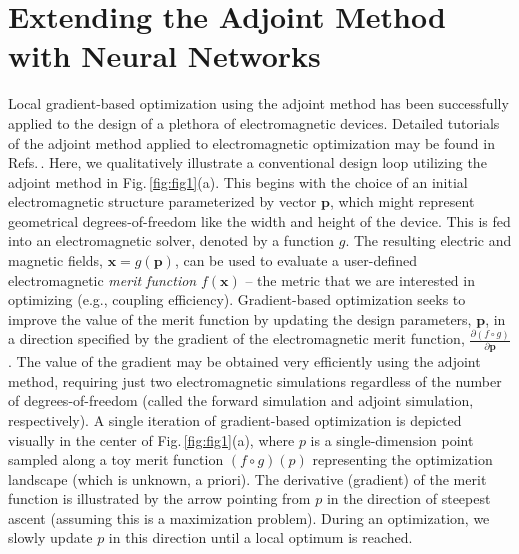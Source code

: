 \documentclass{article}
\begin{document}
\section{Extending the Adjoint Method with Neural Networks}
\label{sec:description}


Local gradient-based optimization using the adjoint method has been successfully applied to the design of a plethora of electromagnetic devices. Detailed tutorials of the adjoint method applied to electromagnetic optimization may be found in Refs.\,\cite{jensen_topology_2011, lu_objective-first_2012, lalau-keraly_adjoint_2013, elesin_time_2014,  michaels_leveraging_2018,   hughes_adjoint_2018, zeng_inverse_2021}. Here, we qualitatively illustrate a conventional design loop utilizing the adjoint method in Fig.\,\ref{fig:fig1}(a).  This begins with the choice of an initial electromagnetic structure parameterized by vector $\mathbf{p}$, which might represent geometrical degrees-of-freedom like the width and height of the device. This is fed into an electromagnetic solver, denoted by a function $g$. The resulting electric and magnetic fields, $\mathbf{x}=g(\mathbf{p})$, can be used to evaluate a user-defined electromagnetic \textit{merit function} $f(\mathbf{x})$ -- the metric that we are interested in optimizing (e.g., coupling efficiency). Gradient-based optimization seeks to improve the value of the merit function by updating the design parameters, $\mathbf{p}$, in a direction specified by the gradient of the electromagnetic merit function, $\frac{\partial (f\circ g)}{\partial \mathbf{p}}$. The value of the gradient may be obtained very efficiently using the adjoint method, requiring just two electromagnetic simulations regardless of the number of degrees-of-freedom (called the forward simulation and adjoint simulation, respectively).  A single iteration of gradient-based optimization is depicted visually in the center of Fig.\,\ref{fig:fig1}(a), where $p$ is a single-dimension point sampled along a toy merit function $(f\circ g)(p)$ representing the optimization landscape (which is unknown, a priori). The derivative (gradient) of the merit function is illustrated by the arrow pointing from $p$ in the direction of steepest ascent (assuming this is a maximization problem). During an optimization, we slowly update $p$ in this direction until a local optimum is reached.
\end{document}
